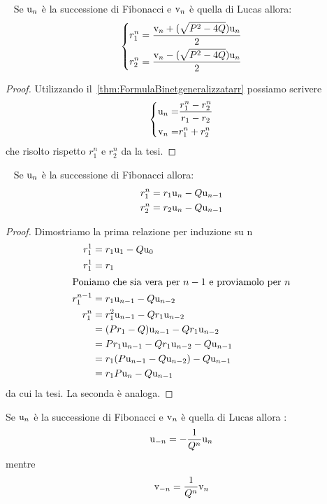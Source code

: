 \begin{thm}~\cite{Rabinowitz_1996}\label{thm:FibLucRimuovirr}
	Se $\mathrm{u}_{n}$ è la successione di Fibonacci e  $\mathrm{v}_{n}$ è quella di Lucas 
	allora:\begin{equation}
		\left\{\begin{aligned}
			r_1^n={}&\dfrac{\mathrm{v}_{n}+(\sqrt{P^2-4Q})\mathrm{u}_{n}}{2}\\
			r_2^n={}&\dfrac{\mathrm{v}_{n}-(\sqrt{P^2-4Q})\mathrm{u}_{n}}{2}\\
		\end{aligned}
		\right.
	\end{equation}
\end{thm}
\begin{proof}
	Utilizzando il~\vref{thm:FormulaBinetgeneralizzatarr} 
	possiamo scrivere
	\begin{equation*}
		\left\{
		\begin{aligned}
			\mathrm{u}_{n}=&\dfrac{r_{1}^n-r_{2}^n}{r_{1}-r_{2}}\\
			\mathrm{v}_{n}=&r_{1}^n+r_{2}^n
		\end{aligned}
		\right.
	\end{equation*}
	che risolto rispetto $r_1^n$ e $r_2^n$ da la tesi.
\end{proof}
\begin{thm}~\cite{Rabinowitz_1996}\label{thm:FibLucRimuovirrpotenze}
	Se $\mathrm{u}_{n}$ è la successione di Fibonacci 
	allora:
		\begin{align}
		r_1^n={}&r_1\mathrm{u}_{n}-Q\mathrm{u}_{n-1}\\
		r_2^n={}&r_2\mathrm{u}_{n}-Q\mathrm{u}_{n-1}\\
		\end{align}
\end{thm}
\begin{proof}
	Dimostriamo la prima relazione per induzione su n
	\begin{align*}
	r_1^1={}&r_1\mathrm{u}_{1}-Q\mathrm{u}_{0}\\
	r_1^1={}&r_1\\
	\intertext{Poniamo che sia vera per $n-1$ e proviamolo per $n$}
	r_1^{n-1}={}&r_1\mathrm{u}_{n-1}-Q\mathrm{u}_{n-2}\\
	r_1^{n}={}&r_1^2\mathrm{u}_{n-1}-Qr_1\mathrm{u}_{n-2}\\
	={}&(Pr_1-Q)\mathrm{u}_{n-1}-Qr_1\mathrm{u}_{n-2}\\
	={}&Pr_1\mathrm{u}_{n-1}-Qr_1\mathrm{u}_{n-2}-Q\mathrm{u}_{n-1}\\
	={}&r_1(P\mathrm{u}_{n-1}-Q\mathrm{u}_{n-2})-Q\mathrm{u}_{n-1}\\
	={}&r_1P\mathrm{u}_{n}-Q\mathrm{u}_{n-1}\\
	\end{align*}
da cui la tesi. La seconda è analoga.
\end{proof}
\begin{thm}\label{thm:FormulaBinetgeneralizzatavalneg}
	Se $\mathrm{u}_{n}$ è la successione di Fibonacci e  $\mathrm{v}_{n}$ è quella di Lucas 
	allora : \begin{equation}
		\mathrm{u}_{-n}=-\dfrac{1}{Q^n}	\mathrm{u}_{n}
	\end{equation}
	mentre \begin{equation}
		\mathrm{v}_{-n}=\dfrac{1}{Q^n}	\mathrm{v}_{n}
	\end{equation}
\end{thm}